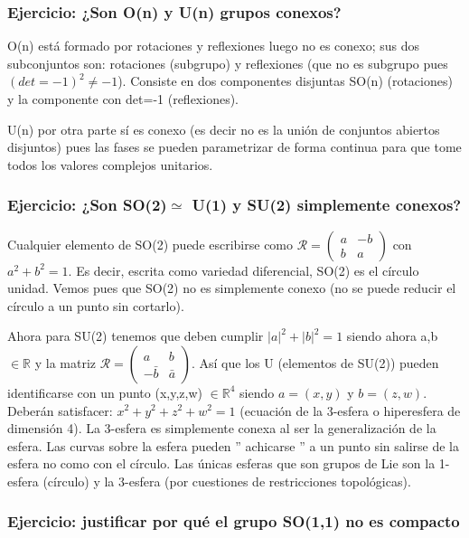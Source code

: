 \documentclass{article}
\begin{document}
\subsubsection{Ejercicio: ¿Son O(n) y U(n) grupos conexos?}

O(n) está formado por rotaciones y reflexiones luego no es conexo; sus dos subconjuntos son: rotaciones (subgrupo) y reflexiones (que no es subgrupo pues $(det=-1)^2 \neq -1$). Consiste en dos componentes disjuntas SO(n) (rotaciones) y la componente con det=-1 (reflexiones).

\smallskip
U(n) por otra parte sí es conexo (es decir no es la unión de conjuntos abiertos disjuntos) pues las fases se pueden parametrizar de forma continua para que tome todos los valores complejos unitarios.

\subsubsection{Ejercicio: ¿Son SO(2)$\simeq $
U(1) y SU(2) simplemente conexos?}

Cualquier elemento de SO(2) puede escribirse como $\mathcal{R}= \left ( \begin{array}{cc}
a &  -b\\
b & a
\end{array}\right)$ con $a^2+b^2=1$. Es decir, escrita como variedad diferencial, SO(2) es el círculo unidad. Vemos pues que SO(2) no es simplemente conexo (no se puede reducir el círculo a un punto sin cortarlo).

\bigskip
Ahora para SU(2) tenemos que deben cumplir $|a|^2+|b|^2=1$ siendo ahora a,b $\in \mathds{R}$ y la matriz $\mathcal{R}= \left ( \begin{array}{cc}
a &  b\\
-\bar{b} & \bar{a}
\end{array}\right)$. Así que los U (elementos de SU(2)) pueden identificarse con un punto (x,y,z,w) $\in \mathds{R}^4$ siendo $a=(x,y)$ y $b=(z,w)$. Deberán satisfacer: $x^2 +y^2 + z^2 + w^2=1$ (ecuación de la 3-esfera o hiperesfera de dimensión 4). La 3-esfera es simplemente conexa al ser la generalización de la esfera. Las curvas sobre la esfera pueden '' achicarse '' a un punto sin salirse de la esfera no como con el círculo. Las únicas esferas que son grupos de Lie son la 1-esfera (círculo) y la 3-esfera (por cuestiones de restricciones topológicas).

\newpage
\subsubsection{Ejercicio: justificar por qué el grupo SO(1,1) no es compacto}
\end{document}
